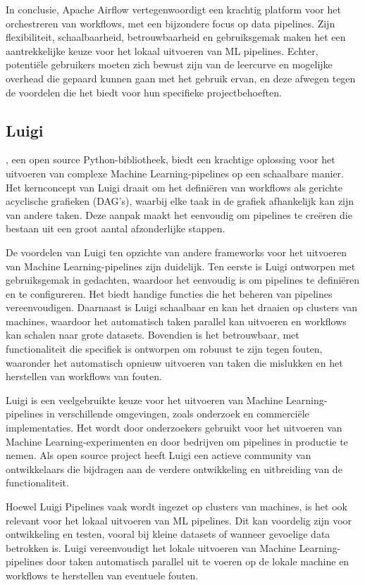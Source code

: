 In conclusie, Apache Airflow vertegenwoordigt een krachtig platform voor het orchestreren van workflows, met een bijzondere focus op data pipelines. Zijn flexibiliteit, schaalbaarheid, betrouwbaarheid en gebruiksgemak maken het een aantrekkelijke keuze voor het lokaal uitvoeren van ML pipelines. Echter, potentiële gebruikers moeten zich bewust zijn van de leercurve en mogelijke overhead die gepaard kunnen gaan met het gebruik ervan, en deze afwegen tegen de voordelen die het biedt voor hun specifieke projectbehoeften.

\subsection{Luigi}

\textcite{Luigi2024}, een open source Python-bibliotheek, biedt een krachtige oplossing voor het uitvoeren van complexe Machine Learning-pipelines op een schaalbare manier. Het kernconcept van Luigi draait om het definiëren van workflows als gerichte acyclische grafieken (DAG's), waarbij elke taak in de grafiek afhankelijk kan zijn van andere taken. Deze aanpak maakt het eenvoudig om pipelines te creëren die bestaan uit een groot aantal afzonderlijke stappen.

De voordelen van Luigi ten opzichte van andere frameworks voor het uitvoeren van Machine Learning-pipelines zijn duidelijk. Ten eerste is Luigi ontworpen met gebruiksgemak in gedachten, waardoor het eenvoudig is om pipelines te definiëren en te configureren. Het biedt handige functies die het beheren van pipelines vereenvoudigen. Daarnaast is Luigi schaalbaar en kan het draaien op clusters van machines, waardoor het automatisch taken parallel kan uitvoeren en workflows kan schalen naar grote datasets. Bovendien is het betrouwbaar, met functionaliteit die specifiek is ontworpen om robuust te zijn tegen fouten, waaronder het automatisch opnieuw uitvoeren van taken die mislukken en het herstellen van workflows van fouten.

Luigi is een veelgebruikte keuze voor het uitvoeren van Machine Learning-pipelines in verschillende omgevingen, zoals onderzoek en commerciële implementaties. Het wordt door onderzoekers gebruikt voor het uitvoeren van Machine Learning-experimenten en door bedrijven om pipelines in productie te nemen. Als open source project heeft Luigi een actieve community van ontwikkelaars die bijdragen aan de verdere ontwikkeling en uitbreiding van de functionaliteit.

Hoewel Luigi Pipelines vaak wordt ingezet op clusters van machines, is het ook relevant voor het lokaal uitvoeren van ML pipelines. Dit kan voordelig zijn voor ontwikkeling en testen, vooral bij kleine datasets of wanneer gevoelige data betrokken is. Luigi vereenvoudigt het lokale uitvoeren van Machine Learning-pipelines door taken automatisch parallel uit te voeren op de lokale machine en workflows te herstellen van eventuele fouten.

